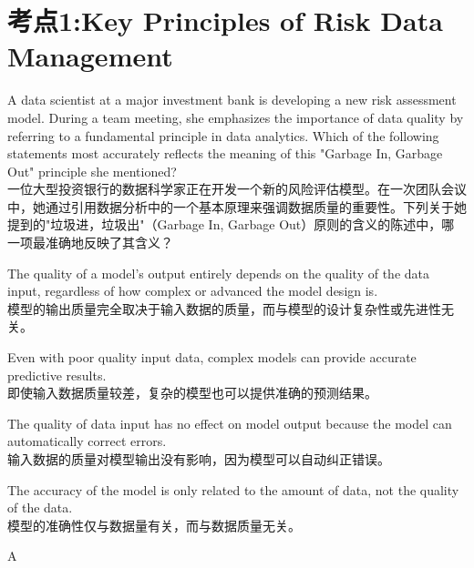 \documentclass{article}
\newcounter{question} %
\begin{document}
 \tableofcontents %
\newpage


\iftrue
\section{考点1:Key Principles of Risk Data Management}
\setcounter{question}{0}


\begin{question}
    A data scientist at a major investment bank is developing a new risk assessment model. During a team meeting, she emphasizes the importance of data quality by referring to a fundamental principle in data analytics. Which of the following statements most accurately reflects the meaning of this "Garbage In, Garbage Out" principle she mentioned?\\
    一位大型投资银行的数据科学家正在开发一个新的风险评估模型。在一次团队会议中，她通过引用数据分析中的一个基本原理来强调数据质量的重要性。下列关于她提到的"垃圾进，垃圾出"（Garbage In, Garbage Out）原则的含义的陈述中，哪一项最准确地反映了其含义？
\end{question}
    
    \begin{choices}
        \item The quality of a model's output entirely depends on the quality of the data input, regardless of how complex or advanced the model design is.  \\
        模型的输出质量完全取决于输入数据的质量，而与模型的设计复杂性或先进性无关。
        \item Even with poor quality input data, complex models can provide accurate predictive results.  \\
        即使输入数据质量较差，复杂的模型也可以提供准确的预测结果。
        \item The quality of data input has no effect on model output because the model can automatically correct errors.  \\
        输入数据的质量对模型输出没有影响，因为模型可以自动纠正错误。
        \item The accuracy of the model is only related to the amount of data, not the quality of the data.  \\
        模型的准确性仅与数据量有关，而与数据质量无关。
    \end{choices}
    
    \begin{correctanswer}
    A
    \end{correctanswer}
    
\end{document}
